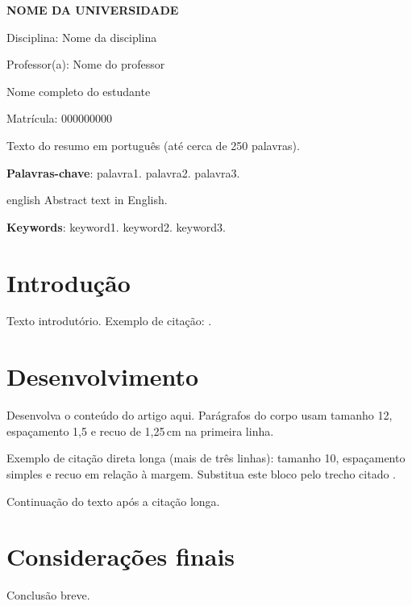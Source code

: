 \documentclass[
  article,
  12pt,
  oneside,
  a4paper,
  english,
  brazil
]{abntex2}
\renewcommand{\ABNTEXchapterfont}{\normalfont}
\newcommand{\universidade}{Nome da Universidade}
\newcommand{\disciplina}{Nome da disciplina}
\newcommand{\professor}{Nome do professor}
\newcommand{\estudante}{Nome completo do estudante}
\newcommand{\matricula}{000000000}
\renewcommand{\imprimircapa}{%
  \begin{capa}
    \begin{center}
      {\large\bfseries\MakeUppercase{\universidade}\par}
      \vspace{1.5cm}
      Disciplina: \disciplina\par
      Professor(a): \professor\par
      \vspace{2.5cm}
      {\ABNTEXchapterfont\bfseries\LARGE\imprimirtitulo\par}
      \vfill
      {\large\estudante\par}
      Matrícula: \matricula\par
      \vfill
      {\large\imprimirlocal\par}
      {\large\imprimirdata\par}
    \end{center}
  \end{capa}
}
\begin{document}
\frenchspacing

\imprimircapa
\maketitle

\begin{resumoumacoluna}
Texto do resumo em português (até cerca de 250 palavras).

\vspace{\onelineskip}
\noindent\textbf{Palavras-chave}: palavra1. palavra2. palavra3.
\end{resumoumacoluna}

\renewcommand{\resumoname}{Abstract}
\begin{resumoumacoluna}
\begin{otherlanguage*}{english}
Abstract text in English.

\vspace{\onelineskip}
\noindent\textbf{Keywords}: keyword1. keyword2. keyword3.
\end{otherlanguage*}
\end{resumoumacoluna}

\textual

\section{Introdução}

Texto introdutório. Exemplo de citação: \cite{exemplo2020}.

\section{Desenvolvimento}

Desenvolva o conteúdo do artigo aqui. Parágrafos do corpo usam tamanho 12,
espaçamento 1,5 e recuo de 1,25\,cm na primeira linha.

\begin{citacao}
Exemplo de citação direta longa (mais de três linhas): tamanho 10,
espaçamento simples e recuo em relação à margem. Substitua este bloco
pelo trecho citado \cite{exemplo2020}.
\end{citacao}

Continuação do texto após a citação longa.

\section{Considerações finais}

Conclusão breve.

\postextual

\end{document}
